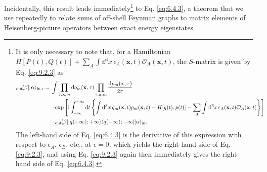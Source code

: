 Incidentally, this result leads immediately\footnote{It is only necessary to
note that, for a Hamiltonian
$H[P(t),Q(t)]+\sum_A\int \dd^3x\,\epsilon_A(\mathbf{x},t)
\mathcal{O}_A(\mathbf{x},t)$, the $S$-matrix is given by Eq. \eqref{eq:9.2.3} as
\begin{align*}
  {}_{\mathrm{out}}\!\langle \beta\rvert\lvert \alpha\rangle_{\mathrm{in},\epsilon}
  ={}&\int\prod_{\tau,\mathbf{x},m}\mathop{}\!\mathrm{d} q_m(\mathbf{x},\tau)
  \prod_{\tau,\mathbf{x},m}\frac{\mathop{}\!\mathrm{d} p_m(\mathbf{x},\tau)}{2\pi}
  \\
  &\cdot\exp\left[\mathrm{i}\int_{-\infty}^{+\infty}\mathop{}\!\mathrm{d} t
  \left\{\int \mathop{}\!\mathrm{d}^3x\,\dot q_m(\mathbf{x},t)p_m(\mathbf{x},t)
  -H[q(t),p(t)]
  -\sum_A\int \mathop{}\!\mathrm{d}^3x\,\epsilon_A(\mathbf{x},t)
  \mathcal{O}_A(\mathbf{x},t)\right\}\right]
  \\
  &\cdot{}_{\mathrm{out}}\!\langle \beta\rvert\lvert q(+\infty);+\infty\rangle
  \langle q(-\infty);-\infty\rvert\lvert \alpha\rangle_{\mathrm{in}}.
\end{align*}
The left-hand side of Eq. \eqref{eq:6.4.3} is the derivative of this expression with
respect to $\epsilon_A$, $\epsilon_B$, etc., at $\epsilon=0$, which yields
the right-hand side of Eq. \eqref{eq:9.2.3}, and using Eq. \eqref{eq:9.2.3} again then
immediately gives the right-hand side of Eq. \eqref{eq:6.4.3}.} to Eq. \eqref{eq:6.4.3}, a
theorem that we use repeatedly to relate sums of off-shell Feynman graphs to
matrix elements of Heisenberg-picture operators between exact energy
eigenstates.

